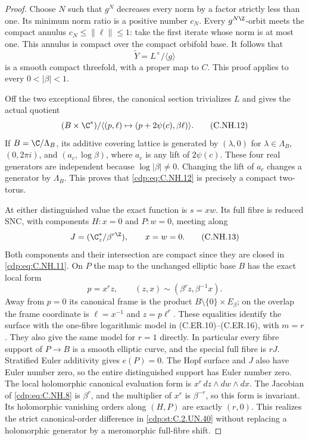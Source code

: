 \begin{proof}
Choose $N$ such that $g^N$ decreases every norm by a factor
strictly less than one. Its minimum norm ratio is a positive
number $c_N$. Every $g^{N\Z}$-orbit meets the compact annulus
$c_N\le\|\ell\|\le1$: take the first iterate whose norm is
at most one. This annulus is compact over the compact
orbifold base. It follows that
\[
                 \widetilde Y=L^\times/\langle g\rangle
                                                        \tag{C.NH.11}\label{cdp:eq:C.NH.11}
\]
is a smooth compact threefold, with a proper map to $C$.
This proof applies to every $0<|\beta|<1$.

Off the two exceptional fibres, the canonical section
trivializes $L$ and gives the actual quotient
\[
 (B\times\C^*)/
   \langle(p,\ell)\mapsto(p+2\psi(c),\beta\ell)\rangle.
                                                        \tag{C.NH.12}\label{cdp:eq:C.NH.12}
\]
If $B=\C/\Lambda_B$, its additive covering lattice is
generated by $(\lambda,0)$ for $\lambda\in\Lambda_B$,
$(0,2\pi i)$, and $(a_c,\log\beta)$, where $a_c$ is any
lift of $2\psi(c)$. These four real generators are
independent because $\log|\beta|\ne0$. Changing the lift
of $a_c$ changes a generator by $\Lambda_B$. This proves
that \eqref{cdp:eq:C.NH.12} is precisely a compact two-torus.

At either distinguished value the exact function is
$s=xw$. Its full fibre is reduced SNC, with components
$H:x=0$ and $P:w=0$, meeting along
\[
          J=(\C^*_z/\beta^{r\Z}),\qquad x=w=0.
                                                        \tag{C.NH.13}\label{cdp:eq:C.NH.13}
\]
Both components and their intersection are compact since
they are closed in \eqref{cdp:eq:C.NH.11}. On $P$ the map to the
unchanged elliptic base $B$ has the exact local form
\[
  p=x^r z,\qquad (z,x)\sim(\beta^r z,\beta^{-1}x).
                                                        \tag{C.NH.14}\label{cdp:eq:C.NH.14}
\]
Away from $p=0$ its canonical frame is the product
$B\setminus\{0\}\times E_\beta$; on the overlap the
frame coordinate is $\ell=x^{-1}$ and $z=p\ell^r$.
These equalities identify the surface with the one-fibre
logarithmic model in (C.ER.10)--(C.ER.16), with $m=r$.
They also give the same model for $r=1$ directly.
In particular every fibre support of $P\to B$ is a
smooth elliptic curve, and the special full fibre is
$rJ$. Stratified Euler additivity gives $e(P)=0$.
The Hopf surface and $J$ also have Euler number zero,
so the entire distinguished support has Euler number zero.
The local holomorphic canonical evaluation form is
$x^r\,dz\wedge dw\wedge dx$. The Jacobian of \eqref{cdp:eq:C.NH.8}
is $\beta^r$, and the multiplier of $x^r$ is $\beta^{-r}$,
so this form is invariant. Its holomorphic vanishing orders
along $(H,P)$ are exactly $(r,0)$. This realizes the
strict canonical-order difference in \ref{cdp:st:C.2.UN.40} without
replacing a holomorphic generator by a meromorphic
full-fibre shift.


\end{proof}
